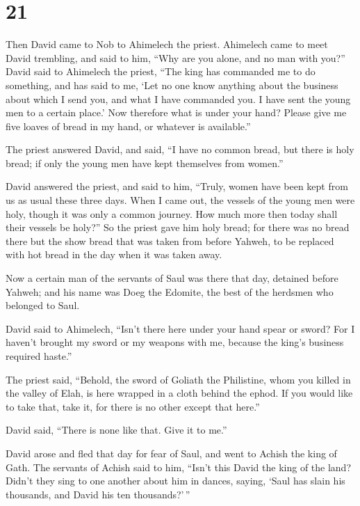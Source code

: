 \hypertarget{section-20}{%
\section{21}\label{section-20}}

 Then David came to Nob to Ahimelech the priest. Ahimelech
came to meet David trembling, and said to him, ``Why are you alone, and
no man with you?''  David said to Ahimelech the priest,
``The king has commanded me to do something, and has said to me, `Let no
one know anything about the business about which I send you, and what I
have commanded you. I have sent the young men to a certain place.'
 Now therefore what is under your hand? Please give me five
loaves of bread in my hand, or whatever is available.''

 The priest answered David, and said, ``I have no common
bread, but there is holy bread; if only the young men have kept
themselves from women.''

 David answered the priest, and said to him, ``Truly, women
have been kept from us as usual these three days. When I came out, the
vessels of the young men were holy, though it was only a common journey.
How much more then today shall their vessels be holy?''  So
the priest gave him holy bread; for there was no bread there but the
show bread that was taken from before Yahweh, to be replaced with hot
bread in the day when it was taken away.

 Now a certain man of the servants of Saul was there that
day, detained before Yahweh; and his name was Doeg the Edomite, the best
of the herdsmen who belonged to Saul.

 David said to Ahimelech, ``Isn't there here under your hand
spear or sword? For I haven't brought my sword or my weapons with me,
because the king's business required haste.''

 The priest said, ``Behold, the sword of Goliath the
Philistine, whom you killed in the valley of Elah, is here wrapped in a
cloth behind the ephod. If you would like to take that, take it, for
there is no other except that here.''

David said, ``There is none like that. Give it to me.''

 David arose and fled that day for fear of Saul, and went
to Achish the king of Gath.  The servants of Achish said to
him, ``Isn't this David the king of the land? Didn't they sing to one
another about him in dances, saying, `Saul has slain his thousands, and
David his ten thousands?'\,''

